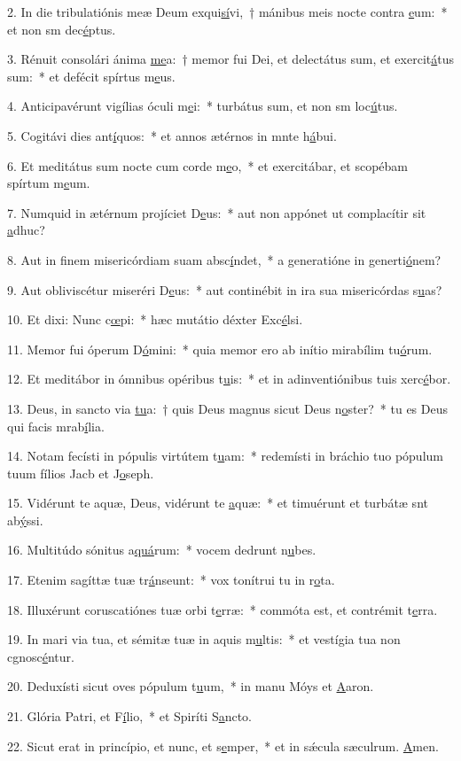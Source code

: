 2. In die tribulatiónis meæ Deum exqui\uline{sí}vi,~† mánibus meis nocte contra \uline{e}um:~* et non sm dec\uline{é}ptus.\par 
3. Rénuit consolári ánima \uline{me}a:~† memor fui Dei, et delectátus sum, et exercit\uline{á}tus sum:~* et defécit spírtus m\uline{e}us.\par 
4. Anticipavérunt vigílias óculi m\uline{e}i:~* turbátus sum, et non sm loc\uline{ú}tus.\par 
5. Cogitávi dies ant\uline{í}quos:~* et annos ætérnos in mnte h\uline{á}bui.\par 
6. Et meditátus sum nocte cum corde m\uline{e}o,~* et exercitábar, et scopébam spírtum m\uline{e}um.\par 
7. Numquid in ætérnum projíciet D\uline{e}us:~* aut non appónet ut complacítir sit \uline{a}dhuc?\par 
8. Aut in finem misericórdiam suam absc\uline{í}ndet,~* a generatióne in generti\uline{ó}nem?\par 
9. Aut obliviscétur miseréri D\uline{e}us:~* aut continébit in ira sua misericórdas s\uline{u}as?\par 
10. Et dixi: Nunc c\uline{œ}pi:~* hæc mutátio déxter Exc\uline{é}lsi.\par 
11. Memor fui óperum D\uline{ó}mini:~* quia memor ero ab inítio mirabílim tu\uline{ó}rum.\par 
12. Et meditábor in ómnibus opéribus t\uline{u}is:~* et in adinventiónibus tuis xerc\uline{é}bor.\par 
13. Deus, in sancto via \uline{tu}a:~† quis Deus magnus sicut Deus n\uline{o}ster?~* tu es Deus qui facis mrab\uline{í}lia.\par 
14. Notam fecísti in pópulis virtútem t\uline{u}am:~* redemísti in bráchio tuo pópulum tuum fílios Jacb et J\uline{o}seph.\par 
15. Vidérunt te aquæ, Deus, vidérunt te \uline{a}quæ:~* et timuérunt et turbátæ snt ab\uline{ý}ssi.\par 
16. Multitúdo sónitus a\uline{quá}rum:~* vocem dedrunt n\uline{u}bes.\par 
17. Etenim sagíttæ tuæ tr\uline{á}nseunt:~* vox tonítrui tu in r\uline{o}ta.\par 
18. Illuxérunt coruscatiónes tuæ orbi t\uline{e}rræ:~* commóta est, et contrémit t\uline{e}rra.\par 
19. In mari via tua, et sémitæ tuæ in aquis m\uline{u}ltis:~* et vestígia tua non cgnosc\uline{é}ntur.\par 
20. Deduxísti sicut oves pópulum t\uline{u}um,~* in manu Móys et \uline{A}aron.\par 
21. Glória Patri, et F\uline{í}lio,~* et Spiríti S\uline{a}ncto.\par 
22. Sicut erat in princípio, et nunc, et s\uline{e}mper,~* et in sǽcula sæculrum. \uline{A}men.\par 
